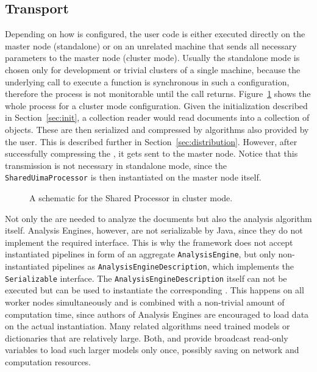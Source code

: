 \subsection{Transport}
Depending on how \spark{} is configured, the user code is either executed directly on the master node (standalone) or on an unrelated machine that sends all necessary parameters to the master node (cluster mode). Usually the standalone mode is chosen only for development or trivial clusters of a single machine, because the underlying call to execute a function is synchronous in such a configuration, therefore the process is not monitorable until the call returns. Figure~\ref{fig:sup_schema} shows the whole process for a cluster mode configuration. Given the initialization described in Section~\ref{sec:init}, a collection reader would read documents into a collection of \cas{} objects. These are then serialized and compressed by algorithms also provided by the user. This is described further in Section~\ref{sec:distribution}. However, after successfully compressing the \cas{}, it gets sent to the \spark{} master node. Notice that this transmission is not necessary in standalone mode, since the \lstinline|SharedUimaProcessor| is then instantiated on the master node itself.
\begin{figure}[htb]
	\centering
	\resizebox{\linewidth}{!}{\small}
	\caption[A schematic for the Shared UIMA Processor in cluster mode.]{A schematic for the Shared \uima{} Processor in cluster mode.}
	\label{fig:sup_schema}
\end{figure}
Not only the \cas{} are needed to analyze the documents but also the analysis algorithm itself. Analysis Engines, however, are not serializable by Java, since they do not implement the required interface. This is why the framework does not accept instantiated pipelines in form of an aggregate \lstinline|AnalysisEngine|, but only non-instantiated pipelines as \lstinline|AnalysisEngineDescription|, which implements the \lstinline|Serializable| interface. The \lstinline|AnalysisEngineDescription| itself can not be executed but can be used to instantiate the corresponding \anen{}. This happens on all worker nodes simultaneously and is combined with a non-trivial amount of computation time, since authors of Analysis Engines are encouraged to load data on the actual instantiation. Many \nlp{} related algorithms need trained models or dictionaries that are relatively large. Both, \uima{} and \spark{} provide broadcast read-only variables to load such larger models only once, possibly saving on network and computation resources.

